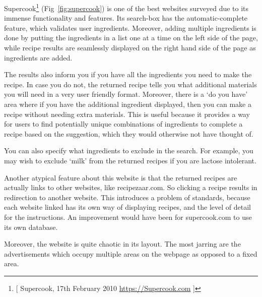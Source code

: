 Supercook\footnote{[ Supercook, 17th February 2010 \url{https://Supercook.com} ]} (Fig~\ref{fig:supercook}) is one of the best websites surveyed due to its immense functionality and features. Its search-box has the automatic-complete feature, which validates user ingredients. Moreover, adding multiple ingredients is done by putting the ingredients in a list one at a time on the left side of the page, while recipe results are seamlessly displayed on the right hand side of the page as ingredients are added.

The results also inform you if you have all the ingredients you need to make the recipe. In case you do not, the returned recipe tells you what additional materials you will need in a very user friendly format. Moreover, there is a ‘do you have’ area where if you have the additional ingredient displayed, then you can make a recipe without needing extra materials. This is useful because it provides a way for users to find potentially unique combinations of ingredients to complete a recipe based on the suggestion, which they would otherwise not have thought of. 

You can also specify what ingredients to exclude in the search. For example, you may wish to exclude ‘milk’ from the returned recipes if you are lactose intolerant.

Another atypical feature about this website is that the returned recipes are actually links to other websites, like recipezaar.com. So clicking a recipe results in redirection to another website. This introduces a problem of standards, because each website linked has its own way of displaying recipes, and the level of detail for the instructions. An improvement would have been for supercook.com to use its own database.

Moreover, the website is quite chaotic in its layout. The most jarring are the advertisements which occupy multiple areas on the webpage as opposed to a fixed area.
